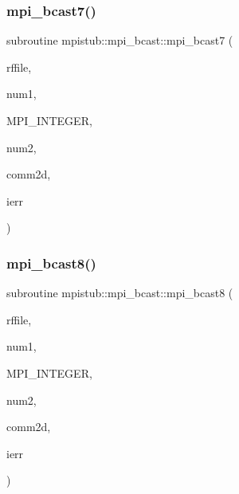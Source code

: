 \mbox{\label{interfacempistub_1_1mpi__bcast_af6d1436abc2d1806a145cb1d3e01d0e6}} 
\subsubsection{\texorpdfstring{mpi\_bcast7()}{mpi\_bcast7()}}
{\footnotesize\ttfamily subroutine mpistub\+::mpi\+\_\+bcast\+::mpi\+\_\+bcast7 (\begin{DoxyParamCaption}\item[{double complex, dimension(\+:,\+:,\+:)}]{rffile,  }\item[{}]{num1,  }\item[{}]{M\+P\+I\+\_\+\+I\+N\+T\+E\+G\+ER,  }\item[{}]{num2,  }\item[{integer}]{comm2d,  }\item[{}]{ierr }\end{DoxyParamCaption})}

\mbox{\label{interfacempistub_1_1mpi__bcast_ad438171b884dbe068cd99a77b82f0a83}} 
\subsubsection{\texorpdfstring{mpi\_bcast8()}{mpi\_bcast8()}}
{\footnotesize\ttfamily subroutine mpistub\+::mpi\+\_\+bcast\+::mpi\+\_\+bcast8 (\begin{DoxyParamCaption}\item[{double complex, dimension(\+:,\+:)}]{rffile,  }\item[{}]{num1,  }\item[{}]{M\+P\+I\+\_\+\+I\+N\+T\+E\+G\+ER,  }\item[{}]{num2,  }\item[{integer}]{comm2d,  }\item[{}]{ierr }\end{DoxyParamCaption})}

\mbox{\label{interfacempistub_1_1mpi__bcast_a43c5a5680dd33e3adc78134abee5a2f0}} 
